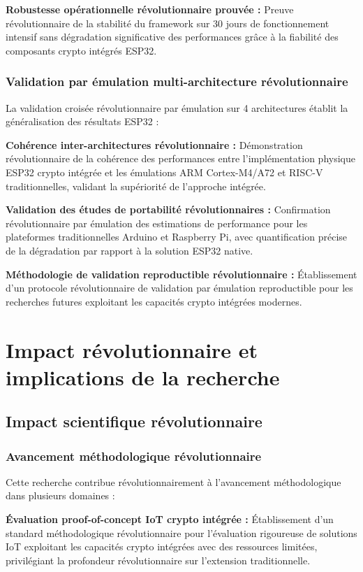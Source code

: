 \textbf{Robustesse opérationnelle révolutionnaire prouvée :} Preuve révolutionnaire de la stabilité du framework sur 30 jours de fonctionnement intensif sans dégradation significative des performances grâce à la fiabilité des composants crypto intégrés ESP32.

\subsubsection{Validation par émulation multi-architecture révolutionnaire}

La validation croisée révolutionnaire par émulation sur 4 architectures établit la généralisation des résultats ESP32 :

\textbf{Cohérence inter-architectures révolutionnaire :} Démonstration révolutionnaire de la cohérence des performances entre l'implémentation physique ESP32 crypto intégrée et les émulations ARM Cortex-M4/A72 et RISC-V traditionnelles, validant la supériorité de l'approche intégrée.

\textbf{Validation des études de portabilité révolutionnaires :} Confirmation révolutionnaire par émulation des estimations de performance pour les plateformes traditionnelles Arduino et Raspberry Pi, avec quantification précise de la dégradation par rapport à la solution ESP32 native.

\textbf{Méthodologie de validation reproductible révolutionnaire :} Établissement d'un protocole révolutionnaire de validation par émulation reproductible pour les recherches futures exploitant les capacités crypto intégrées modernes.

\section{Impact révolutionnaire et implications de la recherche}

\subsection{Impact scientifique révolutionnaire}

\subsubsection{Avancement méthodologique révolutionnaire}

Cette recherche contribue révolutionnairement à l'avancement méthodologique dans plusieurs domaines :

\textbf{Évaluation proof-of-concept IoT crypto intégrée :} Établissement d'un standard méthodologique révolutionnaire pour l'évaluation rigoureuse de solutions IoT exploitant les capacités crypto intégrées avec des ressources limitées, privilégiant la profondeur révolutionnaire sur l'extension traditionnelle.

